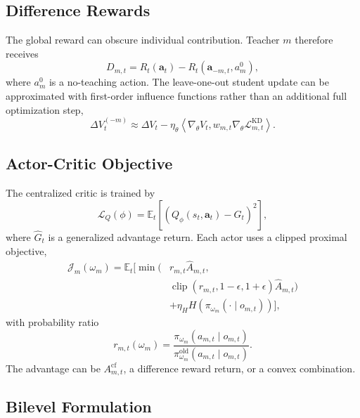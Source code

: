 \documentclass[10pt,twocolumn,a4paper]{article}
\newcommand{\E}{\mathbb{E}}
\newcommand{\cL}{\mathcal{L}}
\newcommand{\cJ}{\mathcal{J}}
\newcommand{\clip}{\operatorname{clip}}
\begin{document}
\subsection{Difference Rewards}

The global reward can obscure individual contribution. Teacher \(m\) therefore receives
\begin{equation}
 D_{m,t}=R_t(\bm a_t)-R_t(\bm a_{-m,t},a_m^{0}),
\label{eq:differencereward}
\end{equation}
where \(a_m^0\) is a no-teaching action. The leave-one-out student update can be approximated with first-order influence functions rather than an additional full optimization step,
\begin{equation}
 \Delta V_t^{(-m)}\approx
 \Delta V_t-\eta_\theta\left\langle
 \nabla_\theta V_t,
 w_{m,t}\nabla_\theta\cL_{m,t}^{\mathrm{KD}}
 \right\rangle.
\label{eq:influence}
\end{equation}

\subsection{Actor-Critic Objective}

The centralized critic is trained by
\begin{equation}
 \cL_Q(\phi)=\E_t\left[
 \left(Q_\phi(s_t,\bm a_t)-\widehat G_t\right)^2
 \right],
\label{eq:criticloss}
\end{equation}
where \(\widehat G_t\) is a generalized advantage return. Each actor uses a clipped proximal objective,
\begin{align}
 \cJ_m(\omega_m)=\E_t\bigg[\min\big(&r_{m,t}\widehat A_{m,t},\nonumber\\
 &\clip(r_{m,t},1-\epsilon,1+\epsilon)\widehat A_{m,t}\big)\nonumber\\
 &+\eta_H H(\pi_{\omega_m}(\cdot\mid o_{m,t}))\bigg],
\label{eq:mappo}
\end{align}
with probability ratio
\begin{equation}
 r_{m,t}(\omega_m)=
 \frac{\pi_{\omega_m}(a_{m,t}\mid o_{m,t})}
 {\pi_{\omega_m}^{\mathrm{old}}(a_{m,t}\mid o_{m,t})}.
\end{equation}
The advantage can be \(A_{m,t}^{\mathrm{cf}}\), a difference reward return, or a convex combination.

\subsection{Bilevel Formulation}
\end{document}
